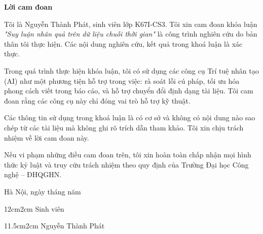 \setcounter{page}{1}
\begin{center}
\textbf{\large{Lời cam đoan}	}
\end{center}
Tôi là Nguyễn Thành Phát, sinh viên lớp K67I-CS3. Tôi xin cam đoan khóa luận \textit{"Suy luận nhân quả trên dữ liệu chuỗi thời gian"} là công trình nghiên cứu do bản thân tôi thực hiện. Các nội dung nghiên cứu, kết quả trong khoá luận là xác thực.

Trong quá trình thực hiện khóa luận, tôi có sử dụng các công cụ Trí tuệ nhân tạo (AI) như một phương tiện hỗ trợ trong việc: rà soát lỗi cú pháp, tối ưu hóa phong cách viết trong báo cáo, và hỗ trợ chuyển đổi định dạng tài liệu. Tôi cam đoan rằng các công cụ này chỉ đóng vai trò hỗ trợ kỹ thuật.

Các thông tin sử dụng trong khoá luận là có cơ sở và không có nội dung nào sao chép từ các tài liệu mà không ghi rõ trích dẫn tham khảo. Tôi xin chịu trách nhiệm về lời cam đoan này.

Nếu vi phạm những điều cam đoan trên, tôi xin hoàn toàn chấp nhận mọi hình thức kỷ luật và truy cứu trách nhiệm theo quy định của Trường Đại học Công nghệ – ĐHQGHN.

\begin{flushright}
Hà Nội, ngày tháng     năm   
\end{flushright}

\begin{changemargin}{12cm}{2cm}
Sinh viên
\\[2cm]
\end{changemargin}

\begin{changemargin}{11.5cm}{2cm}
Nguyễn Thành Phát
\end{changemargin}